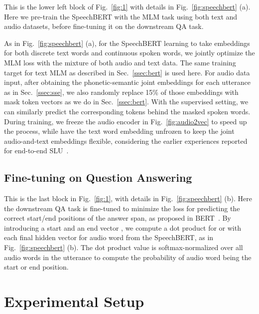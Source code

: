 \documentclass[a4paper]{article}
\begin{document}
\vspace{-5pt}
This is the lower left block of Fig.~\ref{fig:1} with details in Fig.~\ref{fig:speechbert} (a). Here we pre-train the SpeechBERT with the MLM task using both text and audio datasets, before fine-tuning it on the downstream QA task.

As in Fig.~\ref{fig:speechbert} (a), for the SpeechBERT learning to take embeddings for both discrete text words and continuous spoken words, we jointly optimize the MLM loss with the mixture of both audio and text data. The same training target for text MLM as described in Sec.~\ref{ssec:bert} is used here. For audio data input, after obtaining the phonetic-semantic joint embeddings  for each utterance as in Sec.~\ref{ssec:sse}, we also randomly replace 15\% of those embeddings with mask token vectors as we do in Sec.~\ref{ssec:bert}. With the supervised setting, we can similarly predict the corresponding tokens behind the masked spoken words. During training, we freeze the audio encoder in Fig.~\ref{fig:audio2vec} to speed up the process, while have the text word embedding unfrozen to keep the joint audio-and-text embeddings flexible, considering the earlier experiences reported for end-to-end SLU~\cite{Lugosch2019}.

\vspace{-5pt}
\subsection{Fine-tuning on Question Answering}
\label{ssec:finetune}

\vspace{-5pt}
This is the last block in Fig.~\ref{fig:1}, with details in Fig.~\ref{fig:speechbert} (b). Here the downstream QA task is fine-tuned to minimize the loss for predicting the correct start/end positions of the answer span, as proposed in BERT~\cite{devlin2019bert}. By introducing a start and an end vector , we compute a dot product for  or  with each final hidden vector   for audio word  from the SpeechBERT, as in Fig.~\ref{fig:speechbert} (b). The dot product value is softmax-normalized over all audio words in the utterance to compute the probability of audio word  being the start or end position.
 
\vspace{-5pt}
\section{Experimental Setup}
\label{sec:expsetup}
\end{document}
